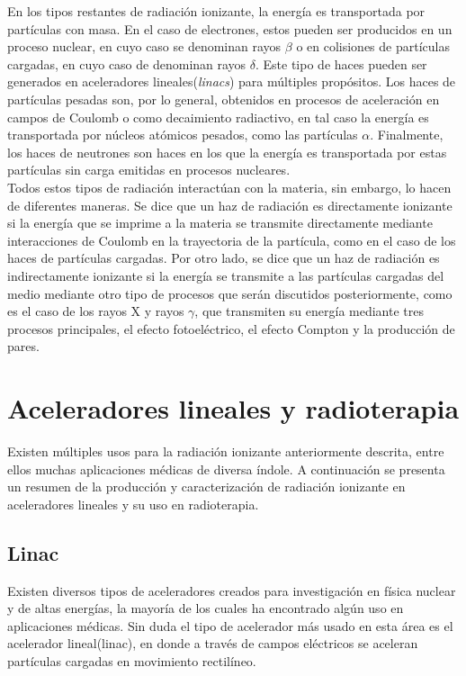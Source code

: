 En los tipos restantes de radiación ionizante, la energía es transportada por partículas con masa. En el caso de electrones, estos pueden ser producidos en un proceso nuclear, en cuyo caso se denominan rayos $\beta$ o en colisiones de partículas cargadas, en cuyo caso de denominan rayos $\delta$. Este tipo de haces pueden ser generados en aceleradores lineales(\textit{linacs}) para múltiples propósitos. Los haces de partículas pesadas son, por lo general, obtenidos en procesos de aceleración en campos de Coulomb o como decaimiento radiactivo, en tal caso la energía es transportada por núcleos atómicos pesados, como las partículas $\alpha$. Finalmente, los haces de neutrones son haces en los que la energía es transportada por estas partículas sin carga emitidas en procesos nucleares. \\

Todos estos tipos de radiación interactúan con la materia, sin embargo, lo hacen de diferentes maneras. Se dice que un haz de radiación es directamente ionizante si la energía que se imprime a la materia se transmite directamente mediante interacciones de Coulomb en la trayectoria de la partícula, como en el caso de los haces de partículas cargadas. Por otro lado, se dice que un haz de radiación es indirectamente ionizante si la energía se transmite a las partículas cargadas del medio mediante otro tipo de procesos que serán discutidos posteriormente, como es el caso de los rayos X y rayos $\gamma$, que transmiten su energía mediante tres procesos principales, el efecto fotoeléctrico, el efecto Compton y la producción de pares.\\

\section{Aceleradores lineales y radioterapia}
Existen múltiples usos para la radiación ionizante anteriormente descrita, entre ellos muchas aplicaciones médicas de diversa índole. A continuación se presenta un resumen de la producción y caracterización de radiación ionizante en aceleradores lineales y su uso en radioterapia. 
\subsection{Linac}
Existen diversos tipos de aceleradores creados para investigación en física nuclear y de altas energías, la mayoría de los cuales ha encontrado algún uso en aplicaciones médicas. Sin duda el tipo de acelerador más usado en esta área es el acelerador lineal(linac), en donde a través de campos eléctricos se aceleran partículas cargadas en movimiento rectilíneo. \\

